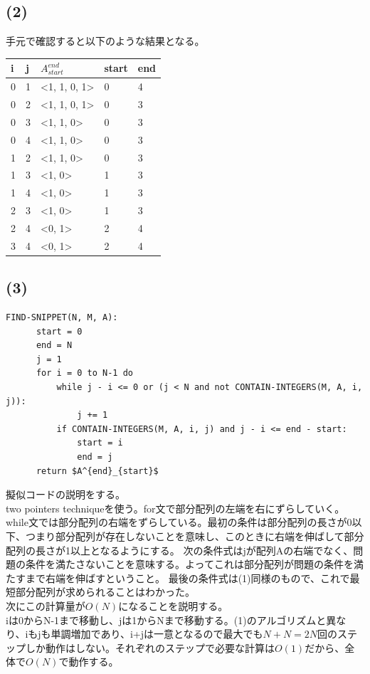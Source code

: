 \documentclass[a4paper,12pt,xelatex,ja=standard]{bxjsarticle}
\begin{document}
  \subsection*{(2)}
  手元で確認すると以下のような結果となる。
  \begin{center}
    \centering
    \begin{tabular}{|l|l|l|l|l|}
    \hline
    i & j & $A^{end}_{start}$ & start & end \\ \hline \hline
    0 & 1 & <1, 1, 0, 1>    & 0     & 4   \\ \hline
    0 & 2 & <1, 1, 0, 1>    & 0     & 3   \\ \hline
    0 & 3 & <1, 1, 0>       & 0     & 3   \\ \hline
    0 & 4 & <1, 1, 0>       & 0     & 3   \\ \hline
    1 & 2 & <1, 1, 0>       & 0     & 3   \\ \hline
    1 & 3 & <1, 0>          & 1     & 3   \\ \hline
    1 & 4 & <1, 0>          & 1     & 3   \\ \hline
    2 & 3 & <1, 0>          & 1     & 3   \\ \hline
    2 & 4 & <0, 1>          & 2     & 4   \\ \hline
    3 & 4 & <0, 1>          & 2     & 4   \\ \hline
    \end{tabular}
  \end{center}

  \subsection*{(3)}
  \begin{lstlisting}[mathescape]
  FIND-SNIPPET(N, M, A):
      start = 0
      end = N
      j = 1
      for i = 0 to N-1 do
          while j - i <= 0 or (j < N and not CONTAIN-INTEGERS(M, A, i, j)):
              j += 1
          if CONTAIN-INTEGERS(M, A, i, j) and j - i <= end - start:
              start = i
              end = j
      return $A^{end}_{start}$
  \end{lstlisting}
  擬似コードの説明をする。\\
  two pointers techniqueを使う。for文で部分配列の左端を右にずらしていく。\\
  while文では部分配列の右端をずらしている。最初の条件は部分配列の長さが0以下、つまり部分配列が存在しないことを意味し、このときに右端を伸ばして部分配列の長さが1以上となるようにする。
  次の条件式はjが配列Aの右端でなく、問題の条件を満たさないことを意味する。よってこれは部分配列が問題の条件を満たすまで右端を伸ばすということ。
  最後の条件式は(1)同様のもので、これで最短部分配列が求められることはわかった。\\
  次にこの計算量が$O(N)$になることを説明する。\\
  iは0からN-1まで移動し、jは1からNまで移動する。(1)のアルゴリズムと異なり、iもjも単調増加であり、i+jは一意となるので最大でも$N+N=2N$回のステップしか動作はしない。それぞれのステップで必要な計算は$O(1)$だから、全体で$O(N)$で動作する。
\end{document}
